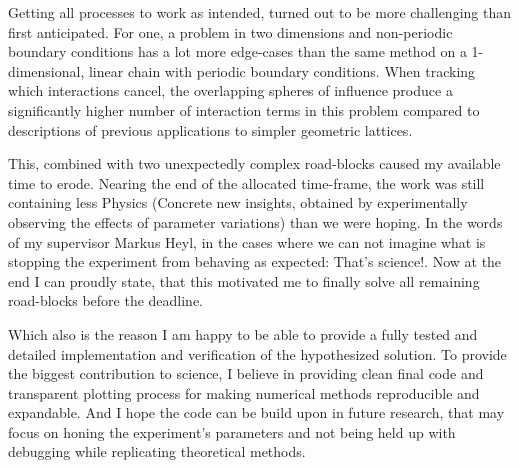 Getting all processes to work as intended, turned out to be more challenging than first anticipated.
For one, a problem in two dimensions and non-periodic boundary conditions has a lot more edge-cases than the same method on a 1-dimensional, linear chain with periodic boundary conditions.
When tracking which interactions cancel, the overlapping \glqq spheres of influence\grqq{} produce a significantly higher number of interaction terms in this problem compared to descriptions of previous applications to simpler geometric lattices.

This, combined with two unexpectedly complex road-blocks caused my available time to erode.
Nearing the end of the allocated time-frame, the work was still containing less \glqq Physics\grqq{} (Concrete new insights, obtained by experimentally observing the effects of parameter variations) than we were hoping.
In the words of my supervisor Markus Heyl, in the cases where we can not imagine what is stopping the experiment from behaving as expected: \glqq That's science!\grqq{}.
Now at the end I can proudly state, that this motivated me to finally solve all remaining road-blocks before the deadline.

Which also is the reason I am happy to be able to provide a fully tested and detailed implementation and verification of the hypothesized solution.
To provide the biggest contribution to science, I believe in providing clean final code and transparent plotting process for making numerical methods reproducible and expandable.
And I hope the code can be build upon in future research, that may focus on honing the experiment's parameters and not being held up with debugging while replicating theoretical methods.
